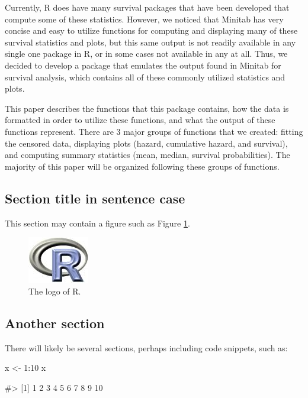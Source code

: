 Currently, R does have many survival packages that have been developed
that compute some of these statistics. However, we noticed that Minitab
has very concise and easy to utilize functions for computing and
displaying many of these survival statistics and plots, but this same
output is not readily available in any single one package in R, or in
some cases not available in any at all. Thus, we decided to develop a
package that emulates the output found in Minitab for survival analysis,
which contains all of these commonly utilized statistics and plots.

This paper describes the functions that this package contains, how the
data is formatted in order to utilize these functions, and what the
output of these functions represent. There are 3 major groups of
functions that we created: fitting the censored data, displaying plots
(hazard, cumulative hazard, and survival), and computing summary
statistics (mean, median, survival probabilities). The majority of this
paper will be organized following these groups of functions.

\hypertarget{section-title-in-sentence-case}{%
\subsection{Section title in sentence
case}\label{section-title-in-sentence-case}}

This section may contain a figure such as Figure \ref{figure:rlogo}.

\begin{figure}[htbp]
  \centering
  \includegraphics{Rlogo}
  \caption{The logo of R.}
  \label{figure:rlogo}
\end{figure}

\hypertarget{another-section}{%
\subsection{Another section}\label{another-section}}

There will likely be several sections, perhaps including code snippets,
such as:

\begin{Schunk}
\begin{Sinput}
x <- 1:10
x
\end{Sinput}
\begin{Soutput}
#>  [1]  1  2  3  4  5  6  7  8  9 10
\end{Soutput}
\end{Schunk}

